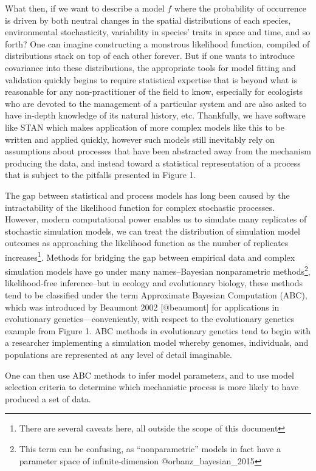 What then, if we want to describe a model \(f\) where the probability of
occurrence is driven by both neutral changes in the spatial
distributions of each species, environmental stochasticity, variability
in species' traits in space and time, and so forth? One can imagine
constructing a monstrous likelihood function, compiled of distributions
stack on top of each other forever. But if one wants to introduce
covariance into these distributions, the appropriate tools for model
fitting and validation quickly begins to require statistical expertise
that is beyond what is reasonable for any non-practitioner of the field
to know, especially for ecologists who are devoted to the management of
a particular system and are also asked to have in-depth knowledge of its
natural history, etc. Thankfully, we have software like STAN which makes
application of more complex models like this to be written and applied
quickly, however such models still inevitably rely on assumptions about
processes that have been abstracted away from the mechanism producing
the data, and instead toward a statistical representation of a process
that is subject to the pitfalls presented in Figure 1.

The gap between statistical and process models has long been caused by
the intractability of the likelihood function for complex stochastic
processes. However, modern computational power enables us to simulate
many replicates of stochastic simulation models, we can treat the
distribution of simulation model outcomes as approaching the likelihood
function as the number of replicates increases\footnote{There are
  several caveats here, all outside the scope of this document}. Methods
for bridging the gap between empirical data and complex simulation
models have go under many names--Bayesian nonparametric
methods\footnote{This term can be confusing, as ``nonparametric'' models
  in fact have a parameter space of infinite-dimension
  @orbanz\_bayesian\_2015}, likelihood-free inference--but in ecology
and evolutionary biology, these methods tend to be classified under the
term Approximate Bayesian Computation (ABC), which was introduced by
Beaumont 2002 {[}@beaumont{]} for applications in evolutionary
genetics---conveniently, with respect to the evolutionary genetics
example from Figure 1. ABC methods in evolutionary genetics tend to
begin with a researcher implementing a simulation model whereby genomes,
individuals, and populations are represented at any level of detail
imaginable.

One can then use ABC methods to infer model parameters, and to use model
selection criteria to determine which mechanistic process is more likely
to have produced a set of data.

